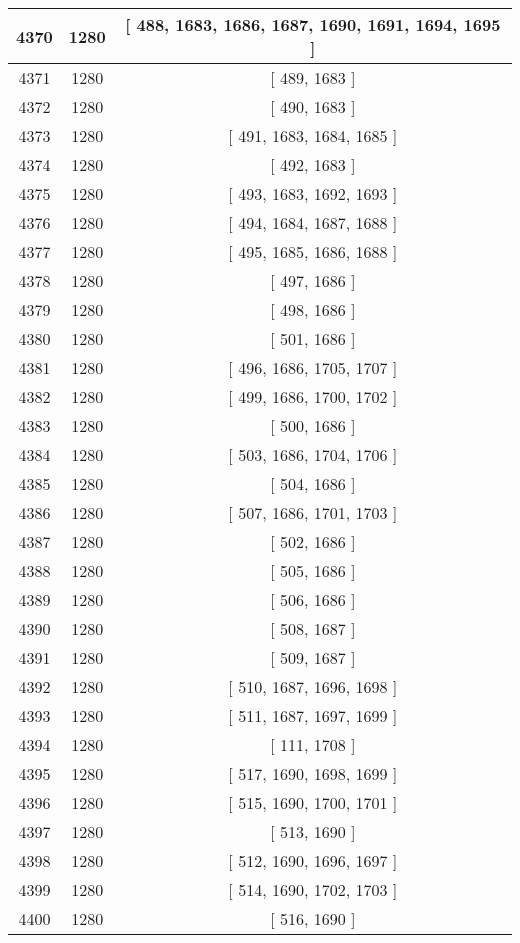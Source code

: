 \begin{center}
\begin{longtable}[H]{|| c c c ||}
\hline
4370 & 1280 & [ 488, 1683, 1686, 1687, 1690, 1691, 1694, 1695 ] \\ 
\hline
4371 & 1280 & [ 489, 1683 ] \\ 
\hline
4372 & 1280 & [ 490, 1683 ] \\ 
\hline
4373 & 1280 & [ 491, 1683, 1684, 1685 ] \\ 
\hline
4374 & 1280 & [ 492, 1683 ] \\ 
\hline
4375 & 1280 & [ 493, 1683, 1692, 1693 ] \\ 
\hline
4376 & 1280 & [ 494, 1684, 1687, 1688 ] \\ 
\hline
4377 & 1280 & [ 495, 1685, 1686, 1688 ] \\ 
\hline
4378 & 1280 & [ 497, 1686 ] \\ 
\hline
4379 & 1280 & [ 498, 1686 ] \\ 
\hline
4380 & 1280 & [ 501, 1686 ] \\ 
\hline
4381 & 1280 & [ 496, 1686, 1705, 1707 ] \\ 
\hline
4382 & 1280 & [ 499, 1686, 1700, 1702 ] \\ 
\hline
4383 & 1280 & [ 500, 1686 ] \\ 
\hline
4384 & 1280 & [ 503, 1686, 1704, 1706 ] \\ 
\hline
4385 & 1280 & [ 504, 1686 ] \\ 
\hline
4386 & 1280 & [ 507, 1686, 1701, 1703 ] \\ 
\hline
4387 & 1280 & [ 502, 1686 ] \\ 
\hline
4388 & 1280 & [ 505, 1686 ] \\ 
\hline
4389 & 1280 & [ 506, 1686 ] \\ 
\hline
4390 & 1280 & [ 508, 1687 ] \\ 
\hline
4391 & 1280 & [ 509, 1687 ] \\ 
\hline
4392 & 1280 & [ 510, 1687, 1696, 1698 ] \\ 
\hline
4393 & 1280 & [ 511, 1687, 1697, 1699 ] \\ 
\hline
4394 & 1280 & [ 111, 1708 ] \\ 
\hline
4395 & 1280 & [ 517, 1690, 1698, 1699 ] \\ 
\hline
4396 & 1280 & [ 515, 1690, 1700, 1701 ] \\ 
\hline
4397 & 1280 & [ 513, 1690 ] \\ 
\hline
4398 & 1280 & [ 512, 1690, 1696, 1697 ] \\ 
\hline
4399 & 1280 & [ 514, 1690, 1702, 1703 ] \\ 
\hline
4400 & 1280 & [ 516, 1690 ] \\ 

\end{longtable}
\end{center}
